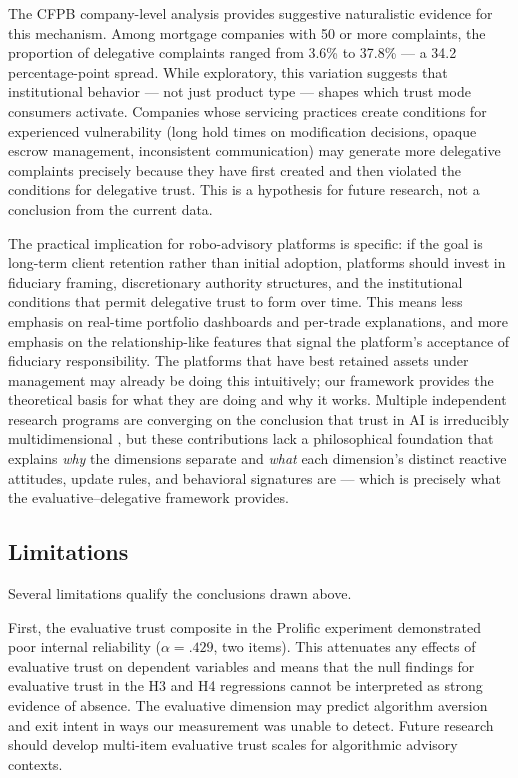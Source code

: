 The CFPB company-level analysis provides suggestive naturalistic evidence for this mechanism. Among mortgage companies with 50 or more complaints, the proportion of delegative complaints ranged from 3.6\% to 37.8\% --- a 34.2 percentage-point spread. While exploratory, this variation suggests that institutional behavior --- not just product type --- shapes which trust mode consumers activate. Companies whose servicing practices create conditions for experienced vulnerability (long hold times on modification decisions, opaque escrow management, inconsistent communication) may generate more delegative complaints precisely because they have first created and then violated the conditions for delegative trust. This is a hypothesis for future research, not a conclusion from the current data.

The practical implication for robo-advisory platforms is specific: if the goal is long-term client retention rather than initial adoption, platforms should invest in fiduciary framing, discretionary authority structures, and the institutional conditions that permit delegative trust to form over time. This means less emphasis on real-time portfolio dashboards and per-trade explanations, and more emphasis on the relationship-like features that signal the platform's acceptance of fiduciary responsibility. The platforms that have best retained assets under management may already be doing this intuitively; our framework provides the theoretical basis for what they are doing and why it works. Multiple independent research programs are converging on the conclusion that trust in AI is irreducibly multidimensional \citep{GliksonWoolley2020, HuangEtAl2026, HermannAlberhasky2026}, but these contributions lack a philosophical foundation that explains \emph{why} the dimensions separate and \emph{what} each dimension's distinct reactive attitudes, update rules, and behavioral signatures are --- which is precisely what the evaluative--delegative framework provides.

\subsection{Limitations}
\label{sec:disc_limitations}

Several limitations qualify the conclusions drawn above.

First, the evaluative trust composite in the Prolific experiment demonstrated poor internal reliability ($\alpha = .429$, two items). This attenuates any effects of evaluative trust on dependent variables and means that the null findings for evaluative trust in the H3 and H4 regressions cannot be interpreted as strong evidence of absence. The evaluative dimension may predict algorithm aversion and exit intent in ways our measurement was unable to detect. Future research should develop multi-item evaluative trust scales for algorithmic advisory contexts.

